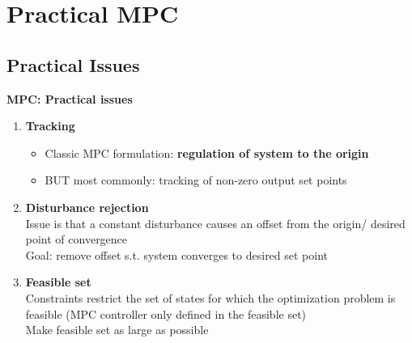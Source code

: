 \section{Practical MPC}
\subsection{Practical Issues}
\textbf{MPC: Practical issues}
\begin{enumerate}
    \item \textbf{Tracking}
    \begin{itemize}
        \item Classic MPC formulation: \textbf{regulation of system to the origin}
        \item BUT most commonly: tracking of non-zero output set points  
    \end{itemize}
    \item \textbf{Disturbance rejection}\\
    Issue is that a constant disturbance causes an offset from the origin/ desired point of convergence\\
    \rightarrow Goal: remove offset s.t. system converges to desired set point
    \item \textbf{Feasible set}\\
    Constraints restrict  the set of states for which the optimization problem is feasible (MPC controller only defined in the feasible set)\\
    \rightarrow Make feasible set as large as possible
\end{enumerate}
